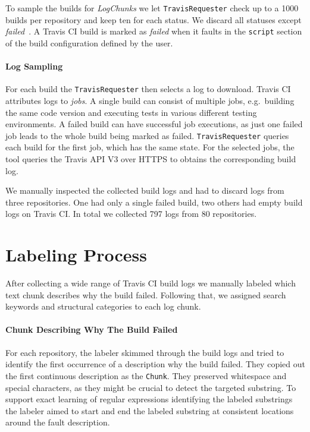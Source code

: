 \documentclass[\myrootdir/main.tex]{subfiles}
\begin{document}
To sample the builds for \emph{LogChunks} we let \texttt{TravisRequester} check up to a 1000 builds per repository and keep ten for each status.
We discard all statuses except \emph{failed}~\cite{travis2009buildstatus}.
A Travis CI build is marked as \emph{failed} when it faults in the \texttt{script} section of the build configuration defined by the user.

\paragraph{Log Sampling}
For each build the \texttt{TravisRequester} then selects a log to download.
Travis CI attributes logs to \emph{jobs}.
A single build can consist of multiple jobs, e.g.\ building the same code version and executing tests in various different testing environments.
A failed build can have successful job executions, as just one failed job leads to the whole build being marked as failed.
\texttt{TravisRequester} queries each build for the first job, which has the same state.
For the selected jobs, the tool queries the Travis API V3 over HTTPS to obtains the corresponding build log.

We manually inspected the collected build logs and had to discard logs from three repositories.
One had only a single failed build, two others had empty build logs on Travis CI\@.
In total we collected 797 logs from 80 repositories.

\section{Labeling Process}
\label{sec:labeling-process}
After collecting a wide range of Travis CI build logs we manually labeled which text chunk describes why the build failed.
Following that, we assigned search keywords and structural categories to each log chunk.

\paragraph{Chunk Describing Why The Build Failed}
For each repository, the labeler skimmed through the build logs and tried to identify the first occurrence of a description why the build failed.
They copied out the first continuous description as the \texttt{Chunk}.
They preserved whitespace and special characters, as they might be crucial to detect the targeted substring.
To support exact learning of regular expressions identifying the labeled substrings the labeler aimed to start and end the labeled substring at consistent locations around the fault description.
\end{document}
